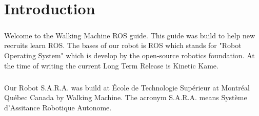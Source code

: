 \chapter{Introduction}
\paragraph{}
Welcome to the Walking Machine ROS guide. This guide was build to help new recruits learn ROS. The bases of our robot is ROS which stands for "Robot Operating System" which is develop by the open-source robotics foundation. At the time of writing the current Long Term Release is Kinetic Kame. 
\paragraph{}
Our Robot S.A.R.A. was build at École de Technologie Supérieur at Montréal Québec Canada by Walking Machine. The acronym S.A.R.A. means Système d'Assitance Robotique Autonome.